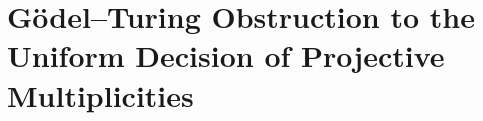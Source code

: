 \chapter{Gödel--Turing Obstruction to the Uniform Decision of Projective Multiplicities}
\label{chap:p3-final:54:godel_turing}

